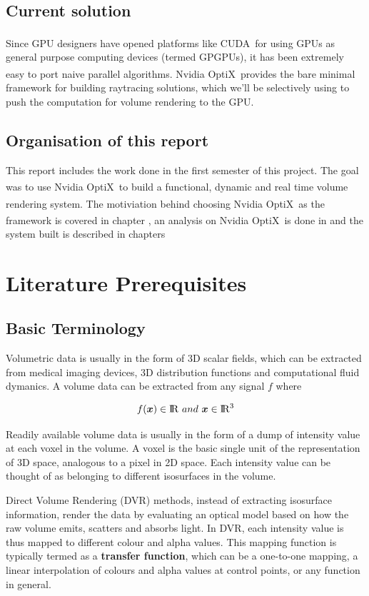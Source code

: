 \documentclass[letterpaper,11pt]{report}
\def\optix{Nvidia\textsuperscript{\textregistered} OptiX\texttrademark\ }
\def\cuda{CUDA\textsuperscript{\textregistered}\    }
\def\R{{\rm I\!R}}
\def\Rthree{{\rm I\!R^3}}
\begin{document}
\section{Current solution}
Since GPU designers have opened platforms like \cuda for using GPUs as general purpose computing devices (termed GPGPUs), it has been extremely easy to port naive parallel algorithms. \optix provides the bare minimal framework for building raytracing solutions, which we'll be selectively using to push the computation for volume rendering to the GPU.

\section{Organisation of this report}
This report includes the work done in the first semester of this project. The goal was to use \optix to build a functional, dynamic and real time volume rendering system. The motiviation behind choosing \optix as the framework is covered in
chapter ,%
an analysis on \optix is done in and %
the system built is described in chapters %




\chapter{Literature Prerequisites}

\section{Basic Terminology}
Volumetric data is usually in the form of 3D scalar fields, which can be extracted from medical imaging devices, 3D distribution functions and computational fluid dymanics. A volume data can be extracted from any signal $f$ where

\[ f(\bm{x}) \in \R\  and\  \bm{x} \in \Rthree \]


Readily available volume data is usually in the form of a dump of intensity value at each voxel in the volume. A voxel is the basic single unit of the representation of 3D space, analogous to a pixel in 2D space. Each intensity value can be thought of as belonging to different isosurfaces in the volume.

Direct Volume Rendering (DVR) methods, instead of extracting isosurface information, render the data by evaluating an optical model based on how the raw volume emits, scatters and absorbs light. In DVR, each intensity value is thus mapped to different colour and alpha values. This mapping function is typically termed as a \textbf{transfer function}, which can be a one-to-one mapping, a linear interpolation of colours and alpha values at control points, or any function in general.
\end{document}
